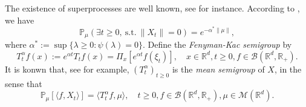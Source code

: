 \documentclass[12pt,oneside,english]{amsart}
\theoremstyle{plain}
\theoremstyle{definition}
\numberwithin{equation}{section}
\begin{document}
	The existence of superprocesses are well known, see \cite{EB} for instance.
    According to \cite[Theorem 12.5 \& Theorem 12.7]{Kyprianou2014Fluctuations}, we have
\begin{equation}
    \mathbb{P}_{\mu} (\exists t\geq 0,~\text{s.t.}~\|X_t\|=0)
    = e^{-\alpha^* \|\mu\|},
\end{equation}
    where $\alpha^* := \sup\{\lambda \geq 0: \psi(\lambda) = 0\}$.
    Define the \emph{Fenyman-Kac semigroup} by
\begin{equation}\label{meansemigroup}
    T^{\alpha}_t f(x)
    :=
    e^{\alpha t} T_t f(x) =
    \Pi_x [e^{\alpha t}f(\xi_t)],
    \quad x\in \mathbb{R}^d,t\geq 0, f\in \mathcal B(\mathbb R^d, \mathbb R_+).
\end{equation}
    It is konwn that, see \cite[Proposition 2.27]{Li2011Measure-valued} for example, $(T^\alpha_t)_{t\geq 0}$ is the \emph{mean semigroup} of $X$, in the sense that
\begin{equation}\label{eq:meanformula}
    \mathbb{P}_{\mu}[\langle f, X_t \rangle]
    = \langle T_t^\alpha f, \mu \rangle,
    \quad t\geq 0, f\in \mathcal B(\mathbb R^d, \mathbb R_+), \mu \in \mathcal M(\mathbb R^d).
\end{equation}
\end{document}
